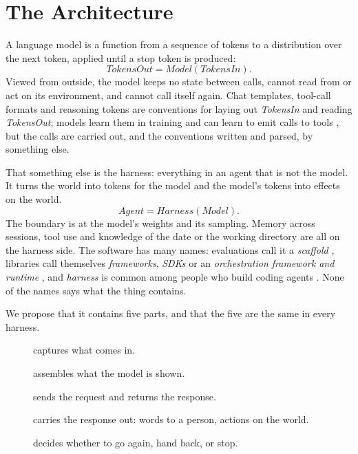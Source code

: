 \section{The Architecture}
\label{sec:architecture}

A language model is a function from a sequence of tokens to a distribution over the next token, applied until a stop token is produced:
\[
  \textit{TokensOut} = \textit{Model}(\textit{TokensIn}).
\]
Viewed from outside, the model keeps no state between calls, cannot read from or act on its environment, and cannot call itself again. Chat templates, tool-call formats and reasoning tokens are conventions for laying out \textit{TokensIn} and reading \textit{TokensOut}; models learn them in training and can learn to emit calls to tools \citep{schick2023toolformer}, but the calls are carried out, and the conventions written and parsed, by something else.

That something else is the harness: everything in an agent that is not the model. It turns the world into tokens for the model and the model's tokens into effects on the world.
\[
  \textit{Agent} = \textit{Harness}(\textit{Model}).
\]
The boundary is at the model's weights and its sampling. Memory across sessions, tool use and knowledge of the date or the working directory are all on the harness side. The software has many names: evaluations call it a \emph{scaffold} \citep{anthropic2025swebench,metr2025update}, libraries call themselves \emph{frameworks}, \emph{SDKs} or an \emph{orchestration framework and runtime} \citep{langgraph}, and \emph{harness} is common among people who build coding agents \citep{anthropic2025harnesses}. None of the names says what the thing contains.

We propose that it contains five parts, and that the five are the same in every harness.

\begin{description}
  \item[] captures what comes in.
  \item[] assembles what the model is shown.
  \item[] sends the request and returns the response.
  \item[] carries the response out: words to a person, actions on the world.
  \item[] decides whether to go again, hand back, or stop.
\end{description}

